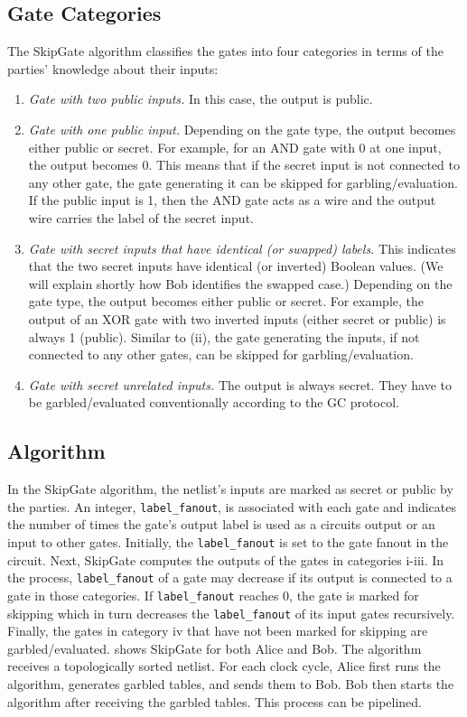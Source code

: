\subsection{Gate Categories}\label{ssec:skipgate_example}
The SkipGate algorithm classifies the gates into four categories in terms of the parties' knowledge about their inputs:

\begin{enumerate}[label=\roman*]
  \item \textit{Gate with two public inputs.} In this case, the output is public.
  \item \textit{Gate with one public input.}
  	Depending on the gate type, the output becomes either public or secret.
  	For example, for an AND gate with 0 at one input, the output becomes 0.
  	This means that if the secret input is not connected to any other gate, the gate generating it can be skipped for garbling/evaluation.
  	If the public input is 1, then the AND gate acts as a wire and the output wire carries the label of the secret input.
  \item \textit{Gate with secret inputs that have identical (or swapped) labels.}
    This indicates that the two secret inputs have identical (or inverted) Boolean values.
    (We will explain shortly how Bob identifies the swapped case.)
    Depending on the gate type, the output becomes either public or secret.
    For example, the output of an XOR gate with two inverted inputs (either secret or public) is always 1 (public).
  	Similar to (ii), the gate generating the inputs, if not connected to any other gates, can be skipped for garbling/evaluation.
  \item \textit{Gate with secret unrelated inputs.}
  	The output is always secret.
  	They have to be garbled/evaluated conventionally according to the GC protocol.
\end{enumerate}

\subsection{Algorithm}\label{ssec:skipgate_algorithm}
In the SkipGate algorithm, the netlist's inputs are marked as secret or public by the parties.
An integer, \texttt{label\_fanout}, is associated with each gate and indicates the number of times the gate's output label is used as a circuits output or an input to other gates.
Initially, the \texttt{label\_fanout} is set to the gate fanout in the circuit.
Next, SkipGate computes the outputs of the gates in categories i-iii.
In the process, \texttt{label\_fanout} of a gate may decrease if its output is connected to a gate in those categories.
If \texttt{label\_fanout} reaches 0, the gate is marked for skipping which in turn decreases the \texttt{label\_fanout} of its input gates recursively.
Finally, the gates in category iv that have not been marked for skipping are garbled/evaluated.
 shows SkipGate for both Alice and Bob.
The algorithm receives a topologically sorted netlist.
For each clock cycle, Alice first runs the algorithm, generates garbled tables, and sends them to Bob.
Bob then starts the algorithm after receiving the garbled tables.
This process can be pipelined.

